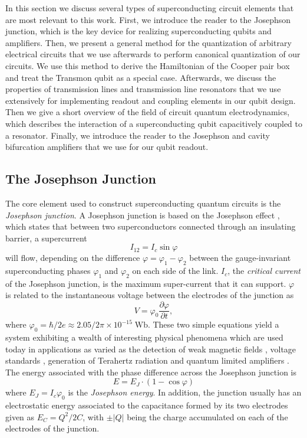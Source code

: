 In this section we discuss several types of superconducting circuit elements that are most relevant to this work. First, we introduce the reader to the Josephson junction, which is the key device for realizing superconducting qubits and amplifiers. Then, we present a general method for the quantization of arbitrary electrical circuits that we use afterwards to perform canonical quantization of our circuits. We use this method to derive the Hamiltonian of the Cooper pair box and treat the Transmon qubit as a special case. Afterwards, we discuss the properties of transmission lines and transmission line resonators that we use extensively for implementing readout and coupling elements in our qubit design. Then we give a short overview of the field of circuit quantum electrodynamics, which describes the interaction of a superconducting qubit capacitively coupled to a  resonator. Finally, we introduce the reader to the Josephson and cavity bifurcation amplifiers that we use for our qubit readout.

\subsection{The Josephson Junction}

The core element used to construct superconducting quantum circuits is the {\it Josephson junction}. A Josephson junction is based on the Josephson effect \citep{josephson_possible_1962}, which states that between two superconductors connected through an insulating barrier, a supercurrent
%
\begin{equation}
I_{12} = I_c\sin{\varphi}
\end{equation}
%
will flow, depending on the difference $\varphi = \varphi_1-\varphi_2$ between the gauge-invariant superconducting phases $\varphi_1$ and $\varphi_2$ on each side of the link. $I_c$, the {\it critical current} of the Josephson junction, is the maximum super-current that it can support. $\varphi$ is related to the instantaneous voltage between the electrodes of the junction as
%
\begin{equation}
V = \varphi_0\frac{\partial \varphi}{\partial t},
\end{equation}
%
where $\varphi_0 =\hbar/2e \approx 2.05/2\pi\times 10^{-15}\;\mathrm{Wb}$. These two simple equations yield a system exhibiting a  wealth of interesting physical phenomena which are used today in applications as varied as the detection of weak magnetic fields \citep{clarke_squid_2005}, voltage standards \citep{levinsen_inverse_1977}, generation of Terahertz radiation \citep{ozyuzer_emission_2007} and quantum limited amplifiers \citep{vijay_invited_2009}. The energy associated with the phase difference across the Josephson junction is
%
\begin{equation}
E = E_J\cdot(1-\cos{\varphi})
\end{equation}
%
where $E_J = I_c\varphi_0$ is the {\it Josephson energy}. In addition, the junction usually has an electrostatic energy associated to the capacitance formed by its two electrodes given as $E_C = Q^2/2C$, with $\pm|Q|$ being the charge accumulated on each of the electrodes of the junction.

